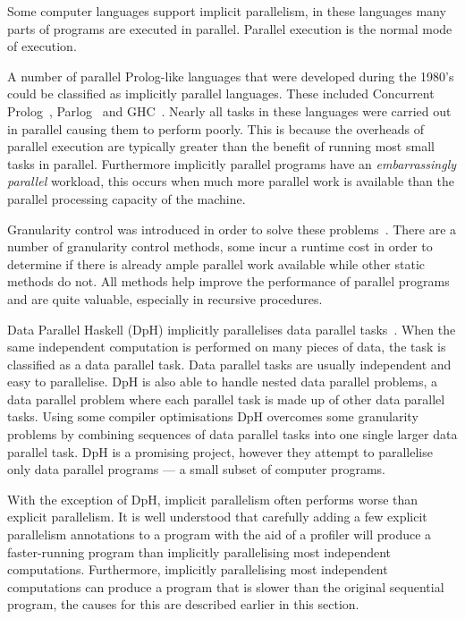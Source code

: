 Some computer languages support implicit parallelism, in these
languages many parts of programs are executed in parallel.  Parallel
execution is the normal mode of execution.

A number of parallel Prolog-like languages that were developed during the
1980's could be classified as implicitly parallel languages.
These included Concurrent
Prolog~\cite{saraswat85:probl_with_concur_prolog,saraswat86:concurrent_prolog_definition,shapiro:flat_concur_prolog},
Parlog~\cite{parlog,clark84:parlog_sys_prog} and GHC~\cite{ueda:ghc}.
Nearly all tasks in these languages were carried out in
parallel causing them to perform poorly.
This is because the overheads of parallel execution are typically
greater than the benefit of running most small tasks in parallel.
Furthermore implicitly parallel programs have an \emph{embarrassingly
  parallel} workload,
this occurs when much more parallel work is available than the parallel
processing capacity of the machine.

Granularity control was introduced in order to solve these
problems~\cite{lopez96:distance_granularity,shen99:granularity_control}.
There are a number of granularity control methods, some incur a
runtime cost in order to determine if there is already ample parallel
work available while other static methods do not.
All methods help improve the performance of parallel programs and are
quite valuable, especially in recursive procedures.

Data Parallel Haskell (DpH) implicitly parallelises data parallel
tasks~\cite{dph:2007:status_report,
  dph:2008:harnessing_the_multicores}.
When the same independent computation is performed on many
pieces of data, the
task is classified as a data parallel task.
Data parallel tasks are usually independent and easy to parallelise.
DpH is also able to handle nested data parallel problems, a
data parallel problem where each parallel task is made up of other
data parallel tasks.
Using some compiler optimisations DpH overcomes some granularity
problems by combining sequences of data parallel tasks into one
single larger data parallel task.
DpH is a promising project,
however they attempt to parallelise only data parallel programs --- a
small subset of computer programs.

With the exception of DpH, implicit parallelism often performs worse
than explicit parallelism.
It is well understood that carefully adding a few explicit parallelism annotations
to a program with the aid of a profiler will produce a faster-running
program than implicitly parallelising most independent computations.
Furthermore, implicitly parallelising most independent computations
can produce a program that is slower than the original sequential
program, the causes for this are described earlier in this section.

